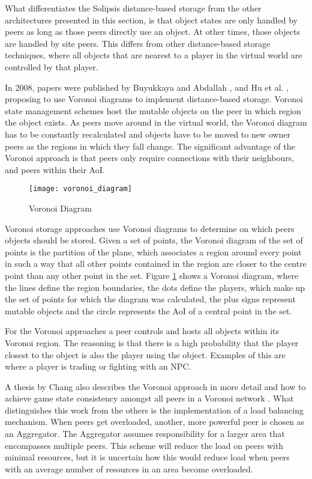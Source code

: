 What differentiates the Solipsis distance-based storage from the other architectures presented in this section, is that object states are only handled by peers as long as those peers directly use an object. At other times, those objects are handled by site peers. This differs from other distance-based storage techniques, where all objects that are nearest to a player in the virtual world are controlled by that player.

In 2008, papers were published by Buyukkaya and Abdallah \cite{Buyukkaya_voronoi_state_management}, and Hu et al. \cite{Hu_voronoi_IM}, proposing to use Voronoi diagrams \cite{voronoi_diagrams_survey} to implement distance-based storage. Voronoi state management schemes host the mutable objects on the peer in which region the object exists. As peers move around in the virtual world, the Voronoi diagram has to be constantly recalculated and objects have to be moved to new owner peers as the regions in which they fall change. The significant advantage of the Voronoi approach is that peers only require connections with their neighbours, and peers within their AoI.

\begin{figure}[htbp]
 \centering
 \texttt{[image: voronoi\_diagram]}
 \caption{Voronoi Diagram \cite{Buyukkaya_voronoi_state_management}}
 \label{fig_voronoi_diagram}
\end{figure}
%
Voronoi storage approaches use Voronoi diagrams to determine on which peers objects should be stored. Given a set of points, the Voronoi diagram of the set of points is the partition of the plane, which associates a region around every point in such a way that all other points contained in the region are closer to the centre point than any other point in the set. Figure \ref{fig_voronoi_diagram} shows a Voronoi diagram, where the lines define the region boundaries, the dots define the players, which make up the set of points for which the diagram was calculated, the plus signs represent mutable objects and the circle represents the AoI of a central point in the set.

For the Voronoi approaches a peer controls and hosts all objects within its Voronoi region. The reasoning is that there is a high probability that the player closest to the object is also the player using the object. Examples of this are where a player is trading or fighting with an NPC.

A thesis by Chang also describes the Voronoi approach in more detail and how to achieve game state consistency amongst all peers in a Voronoi network \cite{Chang_Voronoi_state_management_masters}. What distinguishes this work from the others is the implementation of a load balancing mechanism. When peers get overloaded, another, more powerful peer is chosen as an Aggregator. The Aggregator assumes responsibility for a larger area that encompasses multiple peers. This scheme will reduce the load on peers with minimal resources, but it is uncertain how this would reduce load when peers with an average number of resources in an area become overloaded.

